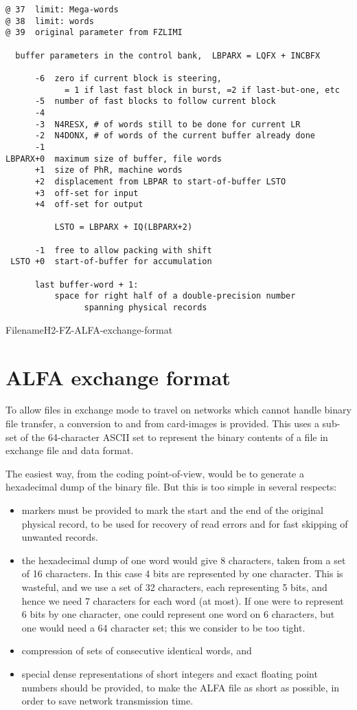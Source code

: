 \begin{verbatim}
@ 37  limit: Mega-words
@ 38  limit: words
@ 39  original parameter from FZLIMI

  buffer parameters in the control bank,  LBPARX = LQFX + INCBFX

      -6  zero if current block is steering,
            = 1 if last fast block in burst, =2 if last-but-one, etc
      -5  number of fast blocks to follow current block
      -4
      -3  N4RESX, # of words still to be done for current LR
      -2  N4DONX, # of words of the current buffer already done
      -1
LBPARX+0  maximum size of buffer, file words
      +1  size of PhR, machine words
      +2  displacement from LBPAR to start-of-buffer LSTO
      +3  off-set for input
      +4  off-set for output

          LSTO = LBPARX + IQ(LBPARX+2)

      -1  free to allow packing with shift
 LSTO +0  start-of-buffer for accumulation

      last buffer-word + 1:
          space for right half of a double-precision number
                spanning physical records
\end{verbatim}

Filename{H2-FZ-ALFA-exchange-format}
\section{ALFA exchange format}

To allow files in exchange mode to travel on networks which
cannot handle binary file transfer, a conversion to and from
card-images is provided.
This uses a sub-set of the 64-character ASCII set
to represent the binary contents of a file
in exchange file and data format.

The easiest way, from the coding point-of-view,
would be to generate a hexadecimal dump of the binary file.
But this is too simple in several respects:

\begin{itemize}
\item markers must be provided to mark the start and the end of the
      original physical record, to be used for recovery of read errors
      and for fast skipping of unwanted records.
\item the hexadecimal dump of one word would give 8 characters,
      taken from a set of 16 characters.
      In this case 4 bits are represented by one character.
      This is wasteful,
      and we use a set of 32 characters,
      each representing 5 bits, and hence we need 7 characters
      for each word (at most).
      If one were to represent 6 bits by one character,
      one could represent one word on 6 characters,
      but one would need a 64 character set;
      this we consider to be too tight.
\item compression of sets of consecutive identical words, and
\item special dense representations of short integers and exact
      floating point numbers should be provided, to make the ALFA file
      as short as possible,
       in order to save network transmission time.
\end{itemize}

